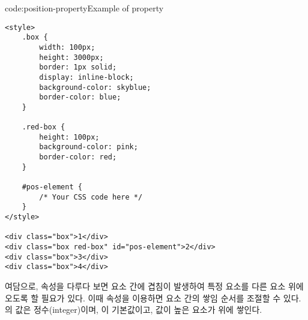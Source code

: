 \begin{code}{code:position-property}{Example of  property}
\begin{verbatim}
<style>
    .box {
        width: 100px;
        height: 3000px;
        border: 1px solid;
        display: inline-block;
        background-color: skyblue;
        border-color: blue;
    }

    .red-box {
        height: 100px;
        background-color: pink;
        border-color: red;
    }

    #pos-element {
        /* Your CSS code here */
    }
</style>

<div class="box">1</div>
<div class="box red-box" id="pos-element">2</div>
<div class="box">3</div>
<div class="box">4</div>
\end{verbatim}
\end{code}

여담으로,  속성을 다루다 보면 요소 간에 겹침이 발생하여 특정 요소를 다른 요소 위에 오도록 할 필요가 있다. 이때  속성을 이용하면 요소 간의 쌓임 순서를 조절할 수 있다. 의 값은 정수(integer)이며, 이 기본값이고, 값이 높은 요소가 위에 쌓인다.
